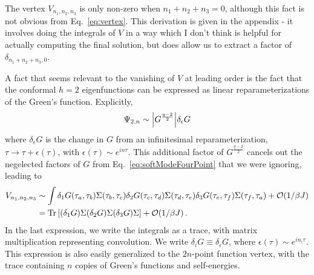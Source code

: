 \documentclass[aps,prx,preprint,onecolumn,citeautoscript,footinbib]{revtex4-1}
\begin{document}
The vertex $V_{n_1, n_2, n_3}$ is only non-zero when $n_1 + n_2 + n_3 = 0$, although this fact is not obvious from Eq.~\ref{eq:vertex}. This derivation is given in the appendix - it involves doing the integrals of $V$ in a way which I don't think is helpful for actually computing the final solution, but does allow us to extract a factor of $\delta_{n_1 + n_2 + n_3, 0}$.

A fact that seems relevant to the vanishing of $V$ at leading order is the fact that the conformal $h=2$ eigenfunctions can be expressed as linear reparameterizations of the Green's function. Explicitly,
\begin{equation}
    \Psi_{2, n} \sim \abs{G^{\frac{q-2}{2}}} \delta_{\epsilon} G 
\end{equation}
where $\delta_\epsilon G$ is the change in $G$ from an infinitesimal reparameterization, $\tau \rightarrow \tau + \epsilon(\tau)$, with $\epsilon(\tau) \sim e^{in\tau}$. This additional factor of $G^{\frac{q-2}{2}}$ cancels out the negelected factors of $G$ from Eq.~\ref{eq:softModeFourPoint} that we were ignoring, leading to 
\begin{equation}
\begin{aligned}
    V_{n_1, n_2, n_3} &\sim \int \delta_1 G(\tau_a, \tau_b) \Sigma(\tau_b, \tau_c) \delta_2 G(\tau_c, \tau_d) \Sigma(\tau_d, \tau_e) \delta_3 G(\tau_e, \tau_f)\Sigma(\tau_f, \tau_a) + \order{1/\beta J}
    \\
    &= \Tr \left[ (\delta_1 G) \Sigma (\delta_2 G) \Sigma (\delta_3 G) \Sigma \right] + \order{1/\beta J}\,.
    \label{eq:vertexSimplified}
    \end{aligned}
\end{equation}
In the last expression, we write the integrals as a trace, with matrix multiplication representing convolution. We write $\delta_i G \equiv \delta_\epsilon G$, where $\epsilon(\tau) \sim e^{i n_i \tau}$. This expression is also easily generalized to the $2n$-point function vertex, with the trace containing $n$ copies of Green's functions and self-energies.
\end{document}
